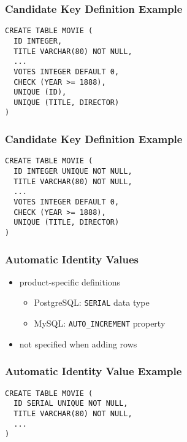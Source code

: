 \documentclass[dvipsnames]{beamer}
\theoremstyle{plain}
\begin{document}
\begin{frame}[fragile]
  \frametitle{Candidate Key Definition Example}

  \begin{example}
    \begin{lstlisting}
CREATE TABLE MOVIE (
  ID INTEGER,
  TITLE VARCHAR(80) NOT NULL,
  ...
  VOTES INTEGER DEFAULT 0,
  CHECK (YEAR >= 1888),
  UNIQUE (ID),
  UNIQUE (TITLE, DIRECTOR)
)
    \end{lstlisting}
  \end{example}
\end{frame}

\begin{frame}[fragile]
  \frametitle{Candidate Key Definition Example}

  \begin{example}
    \begin{lstlisting}
CREATE TABLE MOVIE (
  ID INTEGER UNIQUE NOT NULL,
  TITLE VARCHAR(80) NOT NULL,
  ...
  VOTES INTEGER DEFAULT 0,
  CHECK (YEAR >= 1888),
  UNIQUE (TITLE, DIRECTOR)
)
   \end{lstlisting}
  \end{example}
\end{frame}

\begin{frame}[fragile]
  \frametitle{Automatic Identity Values}

  \begin{itemize}
    \item product-specific definitions

    \begin{itemize}
      \item PostgreSQL: \texttt{SERIAL} data type
      \item MySQL: \texttt{AUTO\_INCREMENT} property
    \end{itemize}

    \pause
    \item not specified when adding rows
  \end{itemize}
\end{frame}

\begin{frame}[fragile]
  \frametitle{Automatic Identity Value Example}

  \begin{example}[PostgreSQL]
    \begin{lstlisting}
CREATE TABLE MOVIE (
  ID SERIAL UNIQUE NOT NULL,
  TITLE VARCHAR(80) NOT NULL,
  ...
)
    \end{lstlisting}
  \end{example}
\end{frame}
\end{document}
